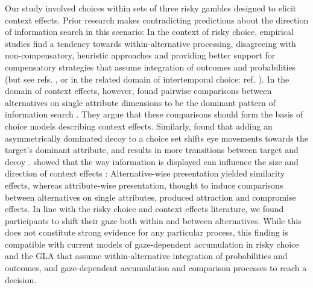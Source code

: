 \documentclass[11pt, a4paper]{article}
\begin{document}
Our study involved choices within sets of three risky gambles designed to elicit context effects. Prior research makes contradicting predictions about the direction of information search in this scenario: In the context of risky choice, empirical studies find a tendency towards within-alternative processing, disagreeing with non-compensatory, heuristic approaches and providing better support for compensatory strategies that assume integration of outcomes and probabilities\autocite{fiedler2012DynamicsDecisionMaking,glockner2011EyetrackingStudyInformation,johnson2008ProcessModelsDeserve} (but see refs. \autocite{russo1983StrategiesMultiattributeBinary, su2013MakingRiskyChoice}, or in the related domain of intertemporal choice: ref. \autocite{amasino2019AmountTimeExert}). In the domain of context effects, however, \citeauthor{noguchi2014AttractionCompromiseSimilarity} found pairwise comparisons between alternatives on single attribute dimensions to be the dominant pattern of information search \autocite{noguchi2014AttractionCompromiseSimilarity}. They argue that these comparisons should form the basis of choice models describing context effects. Similarly, \citeauthor{marini2020AttractionComesMany} found that adding an asymmetrically dominated decoy to a choice set shifts eye movements towards the target’s dominant attribute, and results in more transitions between target and decoy \autocite{marini2020AttractionComesMany}. \citeauthor{cataldo2019ComparisonProcessAccount} showed that the way information is displayed can influence the size and direction of context effects \autocite{cataldo2019ComparisonProcessAccount}: Alternative-wise presentation yielded similarity effects, whereas attribute-wise presentation, thought to induce comparisons between alternatives on single attributes, produced attraction and compromise effects. In line with the risky choice and context effects literature, we found participants to shift their gaze both within and between alternatives. While this does not constitute strong evidence for any particular process, this finding is compatible with current models of gaze-dependent accumulation in risky choice \autocite{glickman2019FormationPreferenceRisky, smith2018AttentionChoiceDomains} and the GLA that assume within-alternative integration of probabilities and outcomes, and gaze-dependent accumulation and comparison processes to reach a decision.
\end{document}
